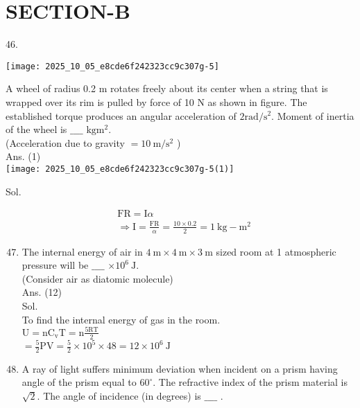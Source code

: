 \documentclass[10pt]{article}
\begin{document}
\section*{SECTION-B}
46.

\begin{center}
\texttt{[image: 2025\_10\_05\_e8cde6f242323cc9c307g-5]}
\end{center}

A wheel of radius 0.2 m rotates freely about its center when a string that is wrapped over its rim is pulled by force of 10 N as shown in figure. The established torque produces an angular acceleration of \(2 \mathrm{rad} / \mathrm{s}^{2}\). Moment of inertia of the wheel is \(\_\_\_\_\) \(\mathrm{kg} \mathrm{m}^{2}\).\\
(Acceleration due to gravity \(=10 \mathrm{~m} / \mathrm{s}^{2}\) )\\
Ans. (1)\\
\texttt{[image: 2025\_10\_05\_e8cde6f242323cc9c307g-5(1)]}

Sol.

\[
\begin{aligned}
& \mathrm{FR}=\mathrm{I} \alpha \\
& \Rightarrow \mathrm{I}=\frac{\mathrm{FR}}{\alpha}=\frac{10 \times 0.2}{2}=1 \mathrm{~kg}-\mathrm{m}^{2}
\end{aligned}
\]

\begin{enumerate}
  \setcounter{enumi}{46}
  \item The internal energy of air in \(4 \mathrm{~m} \times 4 \mathrm{~m} \times 3 \mathrm{~m}\) sized room at 1 atmospheric pressure will be \(\_\_\_\_\) \(\times 10^{6} \mathrm{~J}\).\\
(Consider air as diatomic molecule)\\
Ans. (12)\\
Sol.\\
To find the internal energy of gas in the room.\\
\(\mathrm{U}=\mathrm{nC}_{\mathrm{v}} \mathrm{T}=\mathrm{n} \frac{5 \mathrm{RT}}{2}\)\\
\(=\frac{5}{2} \mathrm{PV}=\frac{5}{2} \times 10^{5} \times 48=12 \times 10^{6} \mathrm{~J}\)
  \item A ray of light suffers minimum deviation when incident on a prism having angle of the prism equal to \(60^{\circ}\). The refractive index of the prism material is \(\sqrt{2}\). The angle of incidence (in degrees) is \(\_\_\_\_\) .
\end{enumerate}
\end{document}
